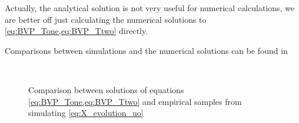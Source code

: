 \documentclass{article}
\begin{document}
Actually, the analytical solution is not very useful for numerical calculations,
we are better off just calculating the numerical solutions to
\cref{eq:BVP_Tone,eq:BVP_Ttwo} directly.

Comparisons between simulations and the numerical solutions can be found in 
\begin{figure}[h]
\begin{center}
\\
\caption[]{Comparison between solutions of equations
\cref{eq:BVP_Tone,eq:BVP_Ttwo} and empirical samples from simulating
\cref{eq:X_evolution_uo} }
\label{fig:label}
\end{center}
\end{figure}
\end{document}
